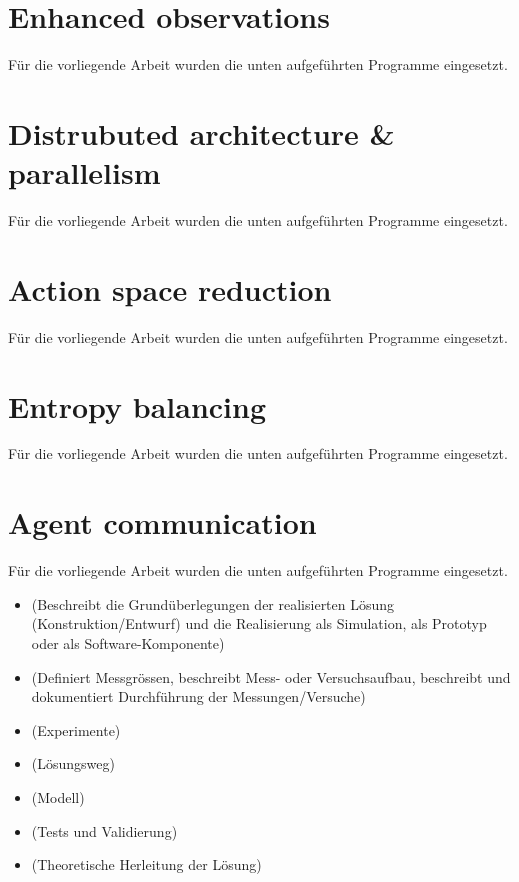 \section{Enhanced observations}\label{enhanced_observations}
Für die vorliegende Arbeit wurden die unten aufgeführten Programme eingesetzt.

\section{Distrubuted architecture & parallelism}\label{dist_architecture}
Für die vorliegende Arbeit wurden die unten aufgeführten Programme eingesetzt.

\section{Action space reduction}\label{reduced_action_space}
Für die vorliegende Arbeit wurden die unten aufgeführten Programme eingesetzt.

\section{Entropy balancing}\label{enhanced_observations}
Für die vorliegende Arbeit wurden die unten aufgeführten Programme eingesetzt.

\section{Agent communication}\label{reduced_action_space}
Für die vorliegende Arbeit wurden die unten aufgeführten Programme eingesetzt.





\begin{itemize}
\item (Beschreibt die Grundüberlegungen der realisierten Lösung (Konstruktion/Entwurf) und die Realisierung als Simulation, als Prototyp oder als Software-Komponente)
\item (Definiert Messgrössen, beschreibt Mess- oder Versuchsaufbau, beschreibt und dokumentiert Durchführung der Messungen/Versuche)
\item (Experimente)
\item (Lösungsweg)
\item (Modell)
\item (Tests und Validierung)
\item (Theoretische Herleitung der Lösung)
\end{itemize}



